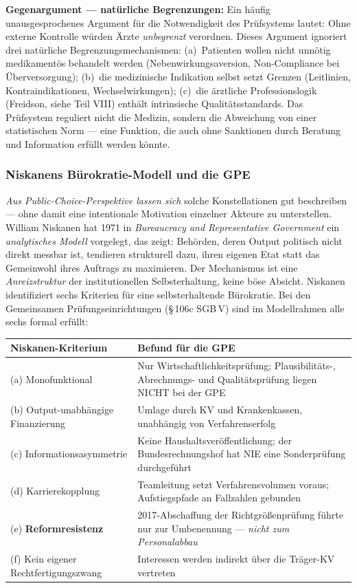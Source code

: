 \documentclass{umbruch-position}
\begin{document}
\textbf{Gegenargument --- natürliche Begrenzungen:} Ein häufig unausgesprochenes Argument für die Notwendigkeit des Prüfsystems lautet: Ohne externe Kontrolle würden Ärzte \textit{unbegrenzt} verordnen. Dieses Argument ignoriert drei natürliche Begrenzungsmechanismen: (a)~Patienten wollen nicht unnötig medikamentös behandelt werden (Nebenwirkungsaversion, Non-Compliance bei Überversorgung); (b)~die medizinische Indikation selbst setzt Grenzen (Leitlinien, Kontraindikationen, Wechselwirkungen); (c)~die ärztliche Professionslogik (Freidson, siehe Teil VIII) enthält intrinsische Qualitätsstandards. Das Prüfsystem reguliert nicht die Medizin, sondern die Abweichung von einer statistischen Norm --- eine Funktion, die auch ohne Sanktionen durch Beratung und Information erfüllt werden könnte.

\subsubsection{Niskanens Bürokratie-Modell und die GPE}

\emph{Aus Public-Choice-Perspektive lassen sich} solche Konstellationen gut beschreiben --- ohne damit eine intentionale Motivation einzelner Akteure zu unterstellen. William Niskanen hat 1971 in \textit{Bureaucracy and Representative Government} ein \emph{analytisches Modell} vorgelegt, das zeigt: Behörden, deren Output politisch nicht direkt messbar ist, tendieren strukturell dazu, ihren eigenen Etat statt das Gemeinwohl ihres Auftrags zu maximieren. Der Mechanismus ist eine \textit{Anreizstruktur} der institutionellen Selbsterhaltung, keine böse Absicht. Niskanen identifiziert sechs Kriterien für eine selbst\-erhaltende Bürokratie. Bei den Gemeinsamen Prüfungseinrichtungen (\S\,106c SGB\,V) sind im Modell\-rahmen alle sechs formal erfüllt:

{\small
\begin{tabularx}{\textwidth}{X X}
\toprule
\textbf{Niskanen-Kriterium} & \textbf{Befund für die GPE} \\
\midrule
(a) Monofunktional & Nur Wirtschaftlichkeitsprüfung; Plausibilitäts-, Abrechnungs- und Qualitätsprüfung liegen NICHT bei der GPE \\
(b) Output-unabhängige Finanzierung & Umlage durch KV und Krankenkassen, unabhängig von Verfahrenserfolg \\
(c) Informationsasymmetrie & Keine Haushaltsveröffentlichung; der Bundesrechnungshof hat NIE eine Sonderprüfung durchgeführt \\
(d) Karrierekopplung & Teamleitung setzt Verfahrensvolumen voraus; Aufstiegspfade an Fallzahlen gebunden \\
(e) \textbf{Reformresistenz} & 2017-Abschaffung der Richtgrößenprüfung führte nur zur Umbenennung — \textit{nicht zum Personalabbau} \\
(f) Kein eigener Rechtfertigungszwang & Interessen werden indirekt über die Träger-KV vertreten \\
\bottomrule
\end{tabularx}
}
\end{document}
